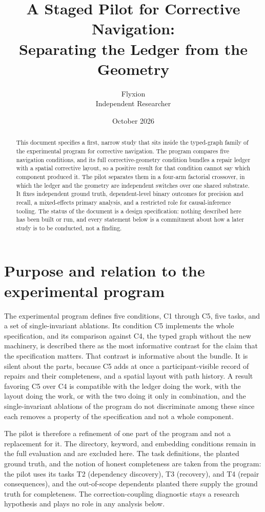 \documentclass[11pt]{article}
\title{A Staged Pilot for Corrective Navigation:\\
Separating the Ledger from the Geometry}
\author{Flyxion\\Independent Researcher}
\date{October 2026}
\theoremstyle{definition}
\begin{document}
\maketitle

\begin{abstract}
\noindent
This document specifies a first, narrow study that sits inside the typed-graph family of the experimental program for corrective navigation. The program compares five navigation conditions, and its full corrective-geometry condition bundles a repair ledger with a spatial corrective layout, so a positive result for that condition cannot say which component produced it. The pilot separates them in a four-arm factorial crossover, in which the ledger and the geometry are independent switches over one shared substrate. It fixes independent ground truth, dependent-level binary outcomes for precision and recall, a mixed-effects primary analysis, and a restricted role for causal-inference tooling. The status of the document is a design specification: nothing described here has been built or run, and every statement below is a commitment about how a later study is to be conducted, not a finding.
\end{abstract}

\section{Purpose and relation to the experimental program}

The experimental program defines five conditions, C1 through C5, five tasks, and a set of single-invariant ablations. Its condition C5 implements the whole specification, and its comparison against C4, the typed graph without the new machinery, is described there as the most informative contrast for the claim that the specification matters. That contrast is informative about the bundle. It is silent about the parts, because C5 adds at once a participant-visible record of repairs and their completeness, and a spatial layout with path history. A result favoring C5 over C4 is compatible with the ledger doing the work, with the layout doing the work, or with the two doing it only in combination, and the single-invariant ablations of the program do not discriminate among these since each removes a property of the specification and not a whole component.

The pilot is therefore a refinement of one part of the program and not a replacement for it. The directory, keyword, and embedding conditions remain in the full evaluation and are excluded here. The task definitions, the planted ground truth, and the notion of honest completeness are taken from the program: the pilot uses its tasks T2 (dependency discovery), T3 (recovery), and T4 (repair consequences), and the out-of-scope dependents planted there supply the ground truth for completeness. The correction-coupling diagnostic stays a research hypothesis and plays no role in any analysis below.
\end{document}
